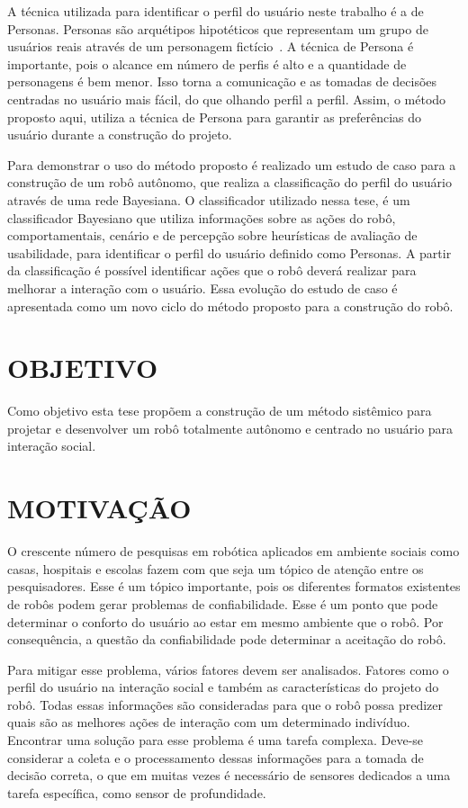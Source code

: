 A técnica utilizada para identificar o perfil do usuário neste trabalho é a de Personas. Personas são arquétipos hipotéticos que representam um grupo de usuários reais através de um personagem fictício~\cite{aquino:2005, masiero:2011}. A técnica de Persona é importante, pois o alcance em número de perfis é alto e a quantidade de personagens é bem menor. Isso torna a comunicação e as tomadas de decisões centradas no usuário mais fácil, do que olhando perfil a perfil. Assim, o método proposto aqui, utiliza a técnica de Persona para garantir as preferências do usuário durante a construção do projeto. 

Para demonstrar o uso do método proposto é realizado um estudo de caso para a construção de um robô autônomo, que realiza a classificação do perfil do usuário através de uma rede Bayesiana. O classificador utilizado nessa tese, é um classificador Bayesiano que utiliza informações sobre as ações do robô, comportamentais, cenário e de percepção sobre heurísticas de avaliação de usabilidade, para identificar o perfil do usuário definido como Personas. A partir da classificação é possível identificar ações que o robô deverá realizar para melhorar a interação com o usuário. Essa evolução do estudo de caso é apresentada como um novo ciclo do método proposto para a construção do robô.

\section{OBJETIVO} %
Como objetivo esta tese propõem a construção de um método sistêmico para projetar e desenvolver um robô totalmente autônomo e centrado no usuário para interação social.

\section{MOTIVAÇÃO}
O crescente número de pesquisas em robótica aplicados em ambiente sociais como casas, hospitais e escolas fazem com que seja um tópico de atenção entre os pesquisadores. Esse é um tópico importante, pois os diferentes formatos existentes de robôs podem gerar problemas de confiabilidade. Esse é um ponto que pode determinar o conforto do usuário ao estar em mesmo ambiente que o robô. Por consequência, a questão da confiabilidade pode determinar a aceitação do robô.

Para mitigar esse problema, vários fatores devem ser analisados. Fatores como o perfil do usuário na interação social e também as características do projeto do robô. Todas essas informações são consideradas para que o robô possa predizer quais são as melhores ações de interação com um determinado indivíduo. Encontrar uma solução  para esse problema é uma tarefa complexa. Deve-se considerar a coleta e o processamento dessas informações para a tomada de decisão correta, o que em muitas vezes é necessário de sensores dedicados a uma tarefa específica, como sensor de profundidade.

